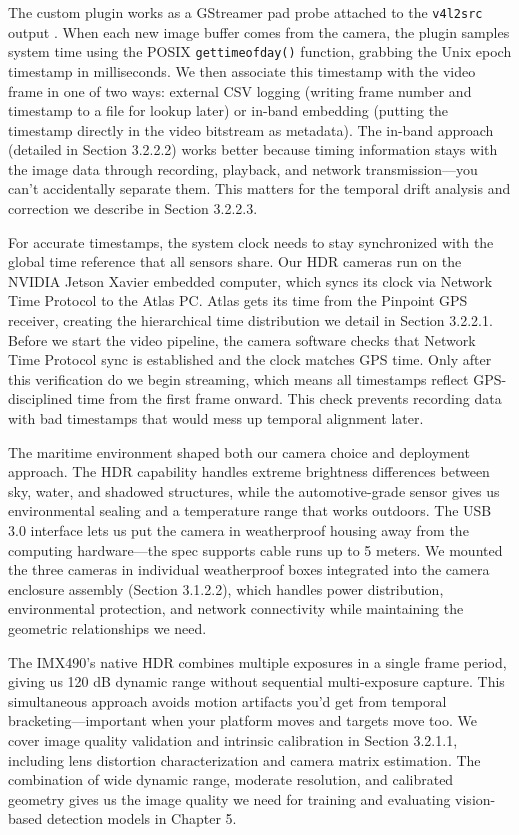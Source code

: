 \documentclass{erauthesis}
\begin{document}
The custom plugin works as a GStreamer pad probe attached to the \texttt{v4l2src} output \cite{thompson2023}.
When each new image buffer comes from the camera, the plugin samples system time using the POSIX \texttt{gettimeofday()} function, grabbing the Unix epoch timestamp in milliseconds.
We then associate this timestamp with the video frame in one of two ways: external CSV logging (writing frame number and timestamp to a file for lookup later) or in-band embedding (putting the timestamp directly in the video bitstream as metadata).
The in-band approach (detailed in Section 3.2.2.2) works better because timing information stays with the image data through recording, playback, and network transmission—you can't accidentally separate them.
This matters for the temporal drift analysis and correction we describe in Section 3.2.2.3.

For accurate timestamps, the system clock needs to stay synchronized with the global time reference that all sensors share.
Our \ac{HDR} cameras run on the NVIDIA Jetson Xavier embedded computer, which syncs its clock via Network Time Protocol to the Atlas PC.
Atlas gets its time from the Pinpoint \ac{GPS} receiver, creating the hierarchical time distribution we detail in Section 3.2.2.1.
Before we start the video pipeline, the camera software checks that Network Time Protocol sync is established and the clock matches \ac{GPS} time.
Only after this verification do we begin streaming, which means all timestamps reflect \ac{GPS}-disciplined time from the first frame onward.
This check prevents recording data with bad timestamps that would mess up temporal alignment later.

The maritime environment shaped both our camera choice and deployment approach.
The \ac{HDR} capability handles extreme brightness differences between sky, water, and shadowed structures, while the automotive-grade sensor gives us environmental sealing and a temperature range that works outdoors.
The USB 3.0 interface lets us put the camera in weatherproof housing away from the computing hardware—the spec supports cable runs up to 5 meters.
We mounted the three cameras in individual weatherproof boxes integrated into the camera enclosure assembly (Section 3.1.2.2), which handles power distribution, environmental protection, and network connectivity while maintaining the geometric relationships we need.

The IMX490's native \ac{HDR} combines multiple exposures in a single frame period, giving us 120 dB dynamic range without sequential multi-exposure capture.
This simultaneous approach avoids motion artifacts you'd get from temporal bracketing—important when your platform moves and targets move too.
We cover image quality validation and intrinsic calibration in Section 3.2.1.1, including lens distortion characterization and camera matrix estimation.
The combination of wide dynamic range, moderate resolution, and calibrated geometry gives us the image quality we need for training and evaluating vision-based detection models in Chapter 5.
\end{document}
